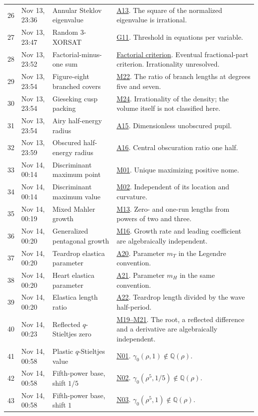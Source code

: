 \documentclass[11pt,a4paper]{article}
\theoremstyle{definition}
\theoremstyle{remark}
\begin{document}
{\begin{longtable}{@{}r>{\raggedright\arraybackslash}p{27mm}>{\raggedright\arraybackslash}p{39mm}>{\raggedright\arraybackslash}p{77mm}@{}}
26 & Nov 13, 23:36 & Annular Steklov eigenvalue & \hyperlink{cat-A13}{A13}. The square of the normalized eigenvalue is irrational. \\
27 & Nov 13, 23:47 & Random $3$-XORSAT & \hyperlink{cat-G11}{G11}. Threshold in equations per variable. \\
28 & Nov 13, 23:52 & Factorial-minus-one sum & \hyperref[sec:erdos]{Factorial criterion}. Eventual fractional-part criterion. Irrationality unresolved. \\
29 & Nov 13, 23:54 & Figure-eight branched covers & \hyperlink{cat-M22}{M22}. The ratio of branch lengths at degrees five and seven. \\
30 & Nov 13, 23:54 & Gieseking cusp packing & \hyperlink{cat-M24}{M24}. Irrationality of the density; the volume itself is not classified here. \\
31 & Nov 13, 23:54 & Airy half-energy radius & \hyperlink{cat-A15}{A15}. Dimensionless unobscured pupil. \\
32 & Nov 13, 23:59 & Obscured half-energy radius & \hyperlink{cat-A16}{A16}. Central obscuration ratio one half. \\
33 & Nov 14, 00:14 & Discriminant maximum point & \hyperlink{cat-M01}{M01}. Unique maximizing positive nome. \\
34 & Nov 14, 00:14 & Discriminant maximum value & \hyperlink{cat-M02}{M02}. Independent of its location and curvature. \\
35 & Nov 14, 00:19 & Mixed Mahler growth & \hyperlink{cat-M13}{M13}. Zero- and one-run lengths from powers of two and three. \\
36 & Nov 14, 00:20 & Generalized pentagonal growth & \hyperlink{cat-M16}{M16}. Growth rate and leading coefficient are algebraically independent. \\
37 & Nov 14, 00:20 & Teardrop elastica parameter & \hyperlink{cat-A20}{A20}. Parameter $m_T$ in the Legendre convention. \\
38 & Nov 14, 00:20 & Heart elastica parameter & \hyperlink{cat-A21}{A21}. Parameter $m_H$ in the same convention. \\
39 & Nov 14, 00:20 & Elastica length ratio & \hyperlink{cat-A22}{A22}. Teardrop length divided by the wave half-period. \\
40 & Nov 14, 00:23 & Reflected $q$-Stieltjes zero & \hyperlink{cat-M19}{M19--M21}. The root, a reflected difference and a derivative are algebraically independent. \\
41 & Nov 14, 00:58 & Plastic $q$-Stieltjes value & \hyperlink{cat-N01}{N01}. $\gamma_0(\rho,1)\notin\mathbb Q(\rho)$. \\
42 & Nov 14, 00:58 & Fifth-power base, shift $1/5$ & \hyperlink{cat-N02}{N02}. $\gamma_0(\rho^5,1/5)\notin\mathbb Q(\rho)$. \\
43 & Nov 14, 00:58 & Fifth-power base, shift $1$ & \hyperlink{cat-N03}{N03}. $\gamma_0(\rho^5,1)\notin\mathbb Q(\rho)$. \\
\end{longtable}}
\end{document}
